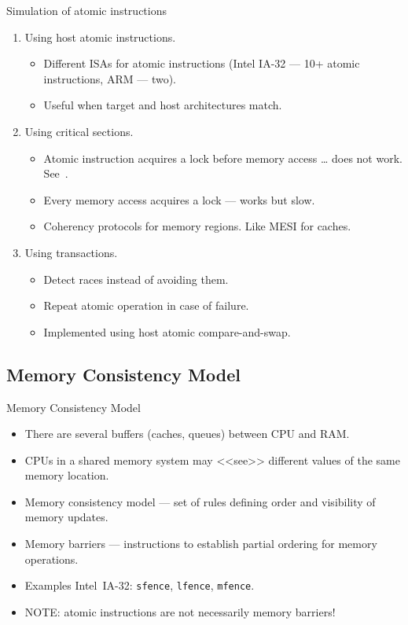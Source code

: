 \begin{frame}{Simulation of atomic instructions}
  \begin{enumerate}
    \item Using host atomic instructions.
    \begin{itemize}
      \item Different ISAs for atomic instructions (Intel IA-32 --- 10+ atomic
        instructions, ARM --- two).
      \item Useful when target and host architectures match. \pause
    \end{itemize}
    \item Using critical sections.
    \begin{itemize}
      \item Atomic instruction acquires a lock before memory access \pause
        \dots{} does not work. See~\cite{wang-coremu}.
      \item Every memory access acquires a lock --- works but slow. \pause
      \item Coherency protocols for memory regions. Like MESI for caches. \pause
    \end{itemize}
    \item Using transactions.
    \begin{itemize}
      \item Detect races instead of avoiding them.
      \item Repeat atomic operation in case of failure.
      \item Implemented using host atomic compare-and-swap.
    \end{itemize}
  \end{enumerate}
\end{frame}

\subsection{Memory Consistency Model}

\begin{frame}{Memory Consistency Model}
  \begin{itemize}
    \item There are several buffers (caches, queues) between CPU and RAM.
    \item CPUs in a shared memory system may <<see>> different values of the
      same memory location.
    \item Memory consistency model --- set of rules defining order and
      visibility of memory updates.
    \pause
    \vfill
    \item Memory barriers --- instructions to establish partial ordering for
      memory operations.
    \item Examples Intel\reg~IA-32: \texttt{sfence}, \texttt{lfence},
      \texttt{mfence}.
    \item NOTE: atomic instructions are not necessarily memory barriers!
  \end{itemize}
\end{frame}

